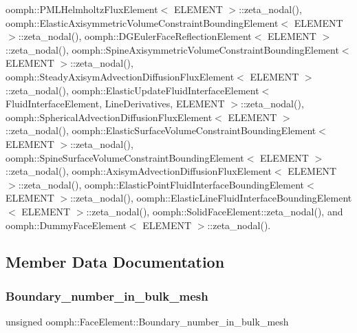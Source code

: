 oomph\+::\+P\+M\+L\+Helmholtz\+Flux\+Element$<$ E\+L\+E\+M\+E\+N\+T $>$\+::zeta\+\_\+nodal(), oomph\+::\+Elastic\+Axisymmetric\+Volume\+Constraint\+Bounding\+Element$<$ E\+L\+E\+M\+E\+N\+T $>$\+::zeta\+\_\+nodal(), oomph\+::\+D\+G\+Euler\+Face\+Reflection\+Element$<$ E\+L\+E\+M\+E\+N\+T $>$\+::zeta\+\_\+nodal(), oomph\+::\+Spine\+Axisymmetric\+Volume\+Constraint\+Bounding\+Element$<$ E\+L\+E\+M\+E\+N\+T $>$\+::zeta\+\_\+nodal(), oomph\+::\+Steady\+Axisym\+Advection\+Diffusion\+Flux\+Element$<$ E\+L\+E\+M\+E\+N\+T $>$\+::zeta\+\_\+nodal(), oomph\+::\+Elastic\+Update\+Fluid\+Interface\+Element$<$ Fluid\+Interface\+Element, Line\+Derivatives, E\+L\+E\+M\+E\+N\+T $>$\+::zeta\+\_\+nodal(), oomph\+::\+Spherical\+Advection\+Diffusion\+Flux\+Element$<$ E\+L\+E\+M\+E\+N\+T $>$\+::zeta\+\_\+nodal(), oomph\+::\+Elastic\+Surface\+Volume\+Constraint\+Bounding\+Element$<$ E\+L\+E\+M\+E\+N\+T $>$\+::zeta\+\_\+nodal(), oomph\+::\+Spine\+Surface\+Volume\+Constraint\+Bounding\+Element$<$ E\+L\+E\+M\+E\+N\+T $>$\+::zeta\+\_\+nodal(), oomph\+::\+Axisym\+Advection\+Diffusion\+Flux\+Element$<$ E\+L\+E\+M\+E\+N\+T $>$\+::zeta\+\_\+nodal(), oomph\+::\+Elastic\+Point\+Fluid\+Interface\+Bounding\+Element$<$ E\+L\+E\+M\+E\+N\+T $>$\+::zeta\+\_\+nodal(), oomph\+::\+Elastic\+Line\+Fluid\+Interface\+Bounding\+Element$<$ E\+L\+E\+M\+E\+N\+T $>$\+::zeta\+\_\+nodal(), oomph\+::\+Solid\+Face\+Element\+::zeta\+\_\+nodal(), and oomph\+::\+Dummy\+Face\+Element$<$ E\+L\+E\+M\+E\+N\+T $>$\+::zeta\+\_\+nodal().



\subsection{Member Data Documentation}
\mbox{\label{classoomph_1_1FaceElement_a12768f6229f232be88da7dfa10fd87be}} 
\subsubsection{\texorpdfstring{Boundary\+\_\+number\+\_\+in\+\_\+bulk\+\_\+mesh}{Boundary\_number\_in\_bulk\_mesh}}
{\footnotesize\ttfamily unsigned oomph\+::\+Face\+Element\+::\+Boundary\+\_\+number\+\_\+in\+\_\+bulk\+\_\+mesh\hspace{0.3cm}{\ttfamily [protected]}}



